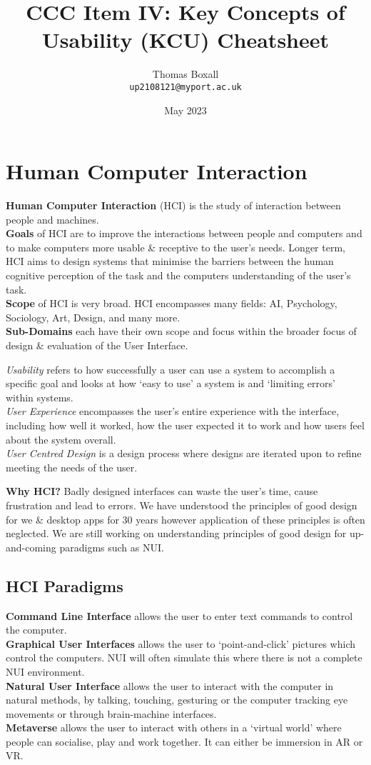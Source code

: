 \documentclass[a4paper,11pt]{article}
\title{CCC Item IV: Key Concepts of Usability (KCU) Cheatsheet}
\author{Thomas Boxall\\ \texttt{up2108121@myport.ac.uk}}
\date{May 2023}
\begin{document}
\maketitle
\thispagestyle{fancy}

\section{Human Computer Interaction}
\textbf{Human Computer Interaction} (HCI) is the study of interaction between people and machines.\\
\textbf{Goals} of HCI are to improve the interactions between people and computers and to make computers more usable \& receptive to the user's needs. Longer term, HCI aims to design systems that minimise the barriers between the human cognitive perception of the task and the computers understanding of the user's task.\\
\textbf{Scope} of HCI is very broad. HCI encompasses many fields: AI, Psychology, Sociology, Art, Design, and many more.\\
\textbf{Sub-Domains} each have their own scope and focus within the broader focus of design \& evaluation of the User Interface.
\begin{adjustwidth}{2em}{1em}
\textit{Usability} refers to how successfully a user can use a system to accomplish a specific goal and looks at how `easy to use' a system is and `limiting errors' within systems.\\
\textit{User Experience} encompasses the user's entire experience with the interface, including how well it worked, how the user expected it to work and how users feel about the system overall.\\
\textit{User Centred Design} is a design process where designs are iterated upon to refine meeting the needs of the user.
\end{adjustwidth}
\textbf{Why HCI?} Badly designed interfaces can waste the user's time, cause frustration and lead to errors. We have understood the principles of good design for we \& desktop apps for 30 years however application of these principles is often neglected. We are still working on understanding principles of good design for up-and-coming paradigms such as NUI.
\subsection{HCI Paradigms}
\textbf{Command Line Interface} allows the user to enter text commands to control the computer.\\
\textbf{Graphical User Interfaces} allows the user to `point-and-click' pictures which control the computers. NUI will often simulate this where there is not a complete NUI environment.\\
\textbf{Natural User Interface} allows the user to interact with the computer in natural methods, by talking, touching, gesturing or the computer tracking eye movements or through brain-machine interfaces.\\
\textbf{Metaverse} allows the user to interact with others in a `virtual world' where people can socialise, play and work together. It can either be immersion in AR or VR.
\end{document}
